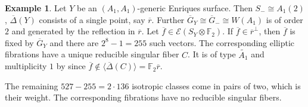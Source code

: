 \documentclass{amsart}
\theoremstyle{definition}
\newtheorem{example}[definition]{Example}
\theoremstyle{plain}
\newcommand{\FF}{\mathbb{F}}
\newcommand{\E}{\mathcal{E}}
\newcommand{\Gbar}{\overline{G}}
\begin{document}
\begin{example}
Let $Y$ be an $(A_1,A_1)$-generic Enriques surface.
Then $S_- \cong A_1(2)$, $\overline{\Delta}(Y)$ consists of a single point, say $\overline{r}$. Further $\Gbar_Y \cong \Gbar_- \cong W(A_1)$ is of order $2$ and generated by the reflection in $\overline{r}$.
Let $\overline{f} \in \E(S_Y\otimes \FF_2)$.
If $\overline{f} \in \overline{r}^\perp$, then \(\overline{f}\) is fixed by $\Gbar_Y$ and there are \(2^{8}-1=255\) such vectors. The corresponding elliptic fibrations have a unique reducible singular fiber $C$. It is of type $\tilde{A_1}$ and multiplicity $1$ by  since $\overline{f} \notin \langle \overline{\Delta}(C)\rangle = \FF_2 \overline{r}$.

The remaining $527-255=2 \cdot 136$ isotropic classes come in pairs of two, which is their weight. The corresponding fibrations have no reducible singular fibers.
\end{example}
\end{document}
